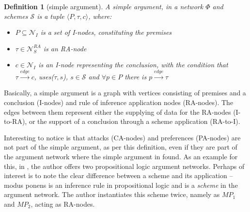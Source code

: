 \documentclass[12pt, a4paper]{article}
\newtheorem{Def}{Definition}[subsection]
\begin{document}
\begin{Def}[simple argument]\label{defsarg}
\sloppy A simple argument, in a network $\Phi$ and schemes $\mathcal{S}$ is a tuple $\langle P, \tau, c \rangle$, where:
\begin{itemize}
    \item $P \subseteq \mathcal{N}_I$ is a set of I-nodes, constituting the premises
    \item $\tau \in \mathcal{N}_S^{RA}$ is an \emph{RA-node}
    \item $c \in \mathcal{N}_I$ is an I-node representing the conclusion, with the condition that $\tau \xrightarrow{edge} c$, uses($\tau, s$), $s \in \mathcal{S}$ and $\forall p \in P$ there is $p \xrightarrow{edge} \tau$
\end{itemize}
\end{Def}
Basically, a simple argument is a graph with vertices consisting of premises and a conclusion (I-nodes) and rule of inference application nodes (RA-nodes). The edges between them represent either the supplying of data for the RA-nodes (I-to-RA), or the support of a conclusion through a scheme application (RA-to-I).

Interesting to notice is that attacks (CA-nodes) and preferences (PA-nodes) are not part of the simple argument, as per this definition, even if they are part of the argument network where the simple argument in found. As an example for this, in \cite[Figure 5.6]{weiss}, the author offers two propositional logic argument networks. Perhaps of interest is to note the clear difference between a scheme and its application -- modus ponens is an inference rule in propositional logic and is a \emph{scheme} in the argument network. The author instantiates this scheme twice, namely as $MP_1$ and $MP_2$, acting as RA-nodes.
\end{document}
